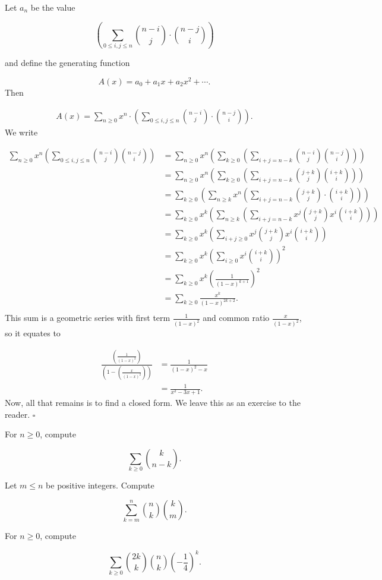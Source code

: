 \documentclass{article}
\begin{document}
\begin{sol}

Let $a_n$ be the value

\[\left(\sum_{0 \le i, j \le n} \binom{n-i}{j} \cdot \binom{n-j}{i}\right)\]

and define the generating function 

\[A(x) = a_0 + a_1x + a_2x^2 + \cdots.\]
Then

\begin{align*}
A(x) = \sum_{n \ge 0} x^n \cdot \left(\sum_{0 \le i, j \le n} \binom{n-i}{j} \cdot \binom{n-j}{i}\right).
\end{align*}
We write

\begin{align*}
\sum_{n \ge 0} x^n\left(\sum_{0 \le i, j \le n} \binom{n-i}{j}\binom{n-j}{i}\right) & = \sum_{n \ge 0} x^n\left(\sum_{k \ge 0} \left(\sum_{i+j=n-k} \binom{n-i}{j}\binom{n-j}{i}\right)\right)\\
& = \sum_{n \ge 0} x^n\left(\sum_{k \ge 0} \left(\sum_{i+j=n-k} \binom{j+k}{j}\binom{i+k}{i}\right)\right)\\
& = \sum_{k \ge 0} \left(\sum_{n \ge k} x^n \left(\sum_{i+j=n-k} \binom{j+k}{j} \cdot \binom{i+k}{i}\right)\right)\\
& = \sum_{k \ge 0} x^k \left(\sum_{n \ge k} \left(\sum_{i+j=n-k} x^j\binom{j+k}{j} x^i\binom{i+k}{i}\right)\right)\\
& = \sum_{k \ge 0} x^k \left(\sum_{i+j \ge 0} x^j\binom{j+k}{j} x^i\binom{i+k}{i}\right)\\
& = \sum_{k \ge 0} x^k \left(\sum_{i \ge 0} x^i\binom{i+k}{i}\right)^2\\
& = \sum_{k \ge 0} x^k \left(\frac{1}{(1-x)^{k+1}}\right)^2\\
& = \sum_{k \ge 0} \frac{x^k}{(1-x)^{2k+2}}.\\
\end{align*}
This sum is a geometric series with first term $\frac{1}{(1-x)^2}$ and common ratio $\frac{x}{(1-x)^2}$, so it equates to

\begin{align*}
\frac{\left(\frac{1}{(1-x)^2}\right)}{\left(1-\left(\frac{x}{(1-x)^2}\right)\right)} & = \frac{1}{(1-x)^2 - x}\\
& = \frac{1}{x^2 - 3x + 1}.
\end{align*}
Now, all that remains is to find a closed form. We leave this as an exercise to the reader. $\square$
\end{sol}

\begin{exer}
For $n \ge 0$, compute

\[\sum_{k \ge 0}\binom{k}{n-k}.\]
\end{exer}

\begin{exer}
Let $m \le n$ be positive integers. Compute

\[\sum_{k=m}^n \binom{n}{k}\binom{k}{m}.\]
\end{exer}

\begin{exer}
For $n \ge 0$, compute

\[\sum_{k \ge 0} \binom{2k}{k}\binom{n}{k}\left(-\frac14\right)^k.\]
\end{exer}
\end{document}
